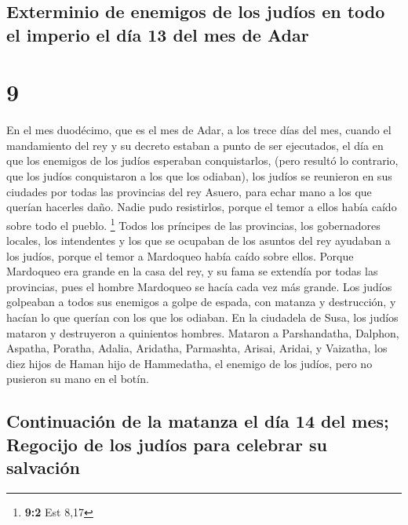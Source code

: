 \hypertarget{exterminio-de-enemigos-de-los-juduxedos-en-todo-el-imperio-el-duxeda-13-del-mes-de-adar}{%
\subsection{Exterminio de enemigos de los judíos en todo el imperio el
día 13 del mes de
Adar}\label{exterminio-de-enemigos-de-los-juduxedos-en-todo-el-imperio-el-duxeda-13-del-mes-de-adar}}

\hypertarget{section-8}{%
\section{9}\label{section-8}}

 En el mes duodécimo, que es el mes de Adar, a los trece
días del mes, cuando el mandamiento del rey y su decreto estaban a punto
de ser ejecutados, el día en que los enemigos de los judíos esperaban
conquistarlos, (pero resultó lo contrario, que los judíos conquistaron a
los que los odiaban),  los judíos se reunieron en sus
ciudades por todas las provincias del rey Asuero, para echar mano a los
que querían hacerles daño. Nadie pudo resistirlos, porque el temor a
ellos había caído sobre todo el pueblo. \footnote{\textbf{9:2} Est 8,17}
 Todos los príncipes de las provincias, los gobernadores
locales, los intendentes y los que se ocupaban de los asuntos del rey
ayudaban a los judíos, porque el temor a Mardoqueo había caído sobre
ellos.  Porque Mardoqueo era grande en la casa del rey, y
su fama se extendía por todas las provincias, pues el hombre Mardoqueo
se hacía cada vez más grande.  Los judíos golpeaban a
todos sus enemigos a golpe de espada, con matanza y destrucción, y
hacían lo que querían con los que los odiaban.  En la
ciudadela de Susa, los judíos mataron y destruyeron a quinientos
hombres.  Mataron a Parshandatha, Dalphon, Aspatha,
 Poratha, Adalia, Aridatha,  Parmashta,
Arisai, Aridai, y Vaizatha,  los diez hijos de Haman hijo
de Hammedatha, el enemigo de los judíos, pero no pusieron su mano en el
botín.

\hypertarget{continuaciuxf3n-de-la-matanza-el-duxeda-14-del-mes-regocijo-de-los-juduxedos-para-celebrar-su-salvaciuxf3n}{%
\subsection{Continuación de la matanza el día 14 del mes; Regocijo de
los judíos para celebrar su
salvación}\label{continuaciuxf3n-de-la-matanza-el-duxeda-14-del-mes-regocijo-de-los-juduxedos-para-celebrar-su-salvaciuxf3n}}

